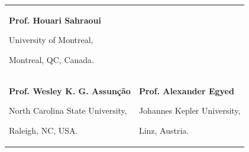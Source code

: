 

\begin{tabularx}{\textwidth}{@{}X X@{}}
\textbf{Prof. Houari Sahraoui}\par 
University of Montreal,\par 
Montreal, QC, Canada.\par 
\makefield{\faEnvelopeO}{\url{sahraoui@iro.umontreal.ca}}
\\ 
\textbf{Prof. Wesley K. G. Assunção}\par
North Carolina State University,\par 
Raleigh, NC, USA.\par 
\makefield{\faEnvelopeO}{\url{wguezas@ncsu.edu}}
&
\textbf{Prof. Alexander Egyed}\par
Johannes Kepler University,\par 
Linz, Austria.\par 
\makefield{\faEnvelopeO}{\url{alexander.egyed@jku.at}}
\\
\end{tabularx}
